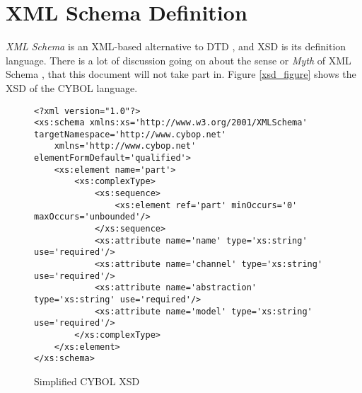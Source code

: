 %
%
%
%
%
%

\section{XML Schema Definition}
\label{xml_schema_definition_heading}

\emph{XML Schema} is an XML-based alternative to DTD \cite{w3schools}, and XSD
is its definition language. There is a lot of discussion going on about the
sense or \emph{Myth} of XML Schema \cite{browne}, that this document will not
take part in. Figure \ref{xsd_figure} shows the XSD of the CYBOL language.

\begin{figure}[ht]
    \bigskip
    \bigskip
    \begin{scriptsize}
        \begin{verbatim}
<?xml version="1.0"?>
<xs:schema xmlns:xs='http://www.w3.org/2001/XMLSchema' targetNamespace='http://www.cybop.net'
    xmlns='http://www.cybop.net' elementFormDefault='qualified'>
    <xs:element name='part'>
        <xs:complexType>
            <xs:sequence>
                <xs:element ref='part' minOccurs='0' maxOccurs='unbounded'/>
            </xs:sequence>
            <xs:attribute name='name' type='xs:string' use='required'/>
            <xs:attribute name='channel' type='xs:string' use='required'/>
            <xs:attribute name='abstraction' type='xs:string' use='required'/>
            <xs:attribute name='model' type='xs:string' use='required'/>
        </xs:complexType>
    </xs:element>
</xs:schema>
        \end{verbatim}
    \end{scriptsize}
    \caption{Simplified CYBOL XSD}
    \label{simplexsd_figure}
\end{figure}

